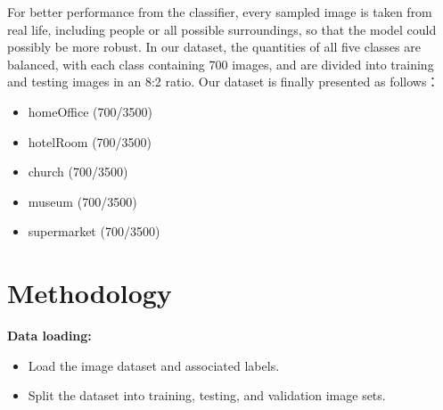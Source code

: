 \documentclass[10pt,twocolumn,letterpaper]{article}
\begin{document}
For better performance from the classifier, every sampled image is taken from real life, including people or all possible surroundings, so that the model could possibly be more robust. In our dataset, the quantities of all five classes are balanced, with each class containing 700 images, and are divided into training and testing images in an 8:2 ratio. Our dataset is finally presented as follows：

\begin{itemize}[noitemsep]
    \item homeOffice (700/3500)
    \item hotelRoom (700/3500)
    \item church (700/3500)
    \item museum (700/3500)
    \item supermarket (700/3500)
\end{itemize}


\section{Methodology}
\indent\textbf{Data loading:}
\begin{itemize}[noitemsep]
    \item Load the image dataset and associated labels.
    \item Split the dataset into training, testing, and validation image sets.
\end{itemize}


\end{document}
